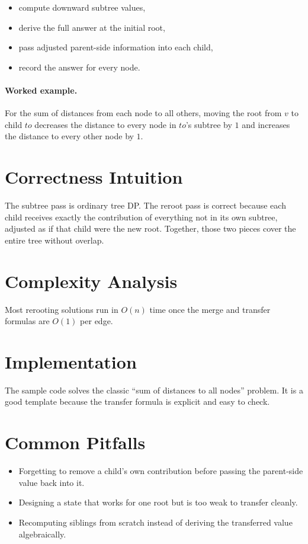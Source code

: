 \begin{itemize}
  \item compute downward subtree values,
  \item derive the full answer at the initial root,
  \item pass adjusted parent-side information into each child,
  \item record the answer for every node.
\end{itemize}

\paragraph{Worked example.}
For the sum of distances from each node to all others, moving the root from \(v\) to child \(to\) decreases the
distance to every node in \(to\)'s subtree by \(1\) and increases the distance to every other node by \(1\).

\section*{Correctness Intuition}

The subtree pass is ordinary tree DP. The reroot pass is correct because each child receives exactly the contribution of
everything not in its own subtree, adjusted as if that child were the new root. Together, those two pieces cover the
entire tree without overlap.

\section*{Complexity Analysis}

Most rerooting solutions run in \(O(n)\) time once the merge and transfer formulas are \(O(1)\) per edge.

\section*{Implementation}

The sample code solves the classic ``sum of distances to all nodes'' problem. It is a good template because the transfer
formula is explicit and easy to check.

\section*{Common Pitfalls}

\begin{itemize}
  \item Forgetting to remove a child's own contribution before passing the parent-side value back into it.
  \item Designing a state that works for one root but is too weak to transfer cleanly.
  \item Recomputing siblings from scratch instead of deriving the transferred value algebraically.
\end{itemize}

